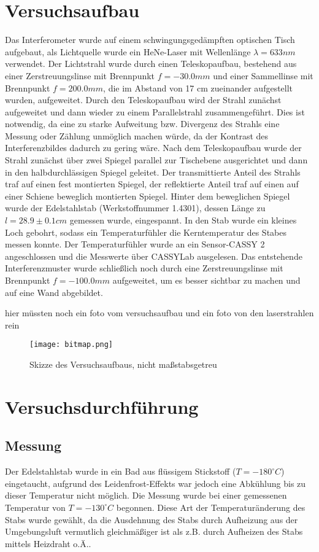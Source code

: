 \section{Versuchsaufbau}

Das Interferometer wurde auf einem schwingungsgedämpften optischen Tisch aufgebaut, als Lichtquelle wurde ein HeNe-Laser mit Wellenlänge $\lambda=633 nm$ verwendet. Der Lichtstrahl wurde durch einen Teleskopaufbau, bestehend aus einer Zerstreuungslinse mit Brennpunkt $f=-30.0 mm$ und einer Sammellinse mit Brennpunkt $f=200.0 mm$, die im Abstand von 17 cm zueinander aufgestellt wurden, aufgeweitet. Durch den Teleskopaufbau wird der Strahl zunächst aufgeweitet und dann wieder zu einem Parallelstrahl zusammengeführt. Dies ist notwendig, da eine zu starke Aufweitung bzw. Divergenz des Strahls eine Messung oder Zählung unmöglich machen würde, da der Kontrast des Interferenzbildes dadurch zu gering wäre. Nach dem Teleskopaufbau wurde der Strahl zunächst über zwei Spiegel parallel zur Tischebene ausgerichtet und dann in den halbdurchlässigen Spiegel geleitet. Der transmittierte Anteil des Strahls traf auf einen fest montierten Spiegel, der reflektierte Anteil traf auf einen auf einer Schiene beweglich montierten Spiegel. Hinter dem beweglichen Spiegel wurde der Edelstahlstab (Werkstoffnummer 1.4301), dessen Länge zu $l=28.9\pm0.1 cm$ gemessen wurde, eingespannt. In den Stab wurde ein kleines Loch gebohrt, sodass ein Temperaturfühler die Kerntemperatur des Stabes messen konnte. Der Temperaturfühler wurde an ein Sensor-CASSY 2 angeschlossen und die Messwerte über CASSYLab ausgelesen. Das entstehende Interferenzmuster wurde schließlich noch durch eine Zerstreuungslinse mit Brennpunkt $f=-100.0 mm$ aufgeweitet, um es besser sichtbar zu machen und auf eine Wand abgebildet.

hier müssten noch ein foto vom versuchsaufbau und ein foto von den laserstrahlen rein

\begin{landscape}
\begin{figure}
\texttt{[image: bitmap.png]}
\caption{Skizze des Versuchsaufbaus, nicht maßstabsgetreu} 
\label{pic:skizze_versuchsaufbau}
\end{figure}
\end{landscape}

\section{Versuchsdurchführung}
\subsection{Messung}
Der Edelstahlstab wurde in ein Bad aus flüssigem Stickstoff ($T=-180^{\circ}C$) eingetaucht, aufgrund des Leidenfrost-Effekts war jedoch eine Abkühlung bis zu dieser Temperatur nicht möglich. Die Messung wurde bei einer gemessenen Temperatur von $T=-130^{\circ}C$ begonnen. Diese Art der Temperaturänderung des Stabs wurde gewählt, da die Ausdehnung des Stabs durch Aufheizung aus der Umgebungsluft vermutlich gleichmäßiger ist als z.B. durch Aufheizen des Stabs mittels Heizdraht o.Ä..

